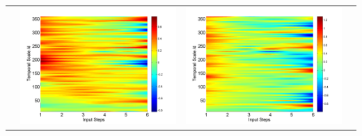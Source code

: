 \documentclass[draft,wrr]{AGUTeX}
\begin{document}
\begin{article}
\begin{table}[H]
\begin{tabular}{cccc}
&\begin{minipage}{.3\textwidth}\includegraphics[width=\linewidth]{resultgraph/06810000pdiff_former.png}\end{minipage}
&\begin{minipage}{.3\textwidth}\includegraphics[width=\linewidth]{resultgraph/06810000epdiff_former.png}\end{minipage}

\end{tabular}
\end{table}
\end{article}
\end{document}
